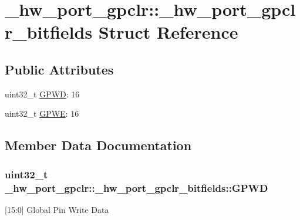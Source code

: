 \hypertarget{struct__hw__port__gpclr_1_1__hw__port__gpclr__bitfields}{}\section{\+\_\+hw\+\_\+port\+\_\+gpclr\+:\+:\+\_\+hw\+\_\+port\+\_\+gpclr\+\_\+bitfields Struct Reference}
\label{struct__hw__port__gpclr_1_1__hw__port__gpclr__bitfields}
\subsection*{Public Attributes}
\begin{DoxyCompactItemize}
\item 
uint32\+\_\+t \hyperlink{struct__hw__port__gpclr_1_1__hw__port__gpclr__bitfields_a1f31630f255df63dab7fcaa1fc482b1f}{G\+P\+WD}\+: 16
\item 
uint32\+\_\+t \hyperlink{struct__hw__port__gpclr_1_1__hw__port__gpclr__bitfields_a3e11c185e7bd3c2fd12611fac0f86a69}{G\+P\+WE}\+: 16
\end{DoxyCompactItemize}


\subsection{Member Data Documentation}
\subsubsection[{\texorpdfstring{G\+P\+WD}{GPWD}}]{\setlength{\rightskip}{0pt plus 5cm}uint32\+\_\+t \+\_\+hw\+\_\+port\+\_\+gpclr\+::\+\_\+hw\+\_\+port\+\_\+gpclr\+\_\+bitfields\+::\+G\+P\+WD}\hypertarget{struct__hw__port__gpclr_1_1__hw__port__gpclr__bitfields_a1f31630f255df63dab7fcaa1fc482b1f}{}\label{struct__hw__port__gpclr_1_1__hw__port__gpclr__bitfields_a1f31630f255df63dab7fcaa1fc482b1f}
\mbox{[}15\+:0\mbox{]} Global Pin Write Data 
